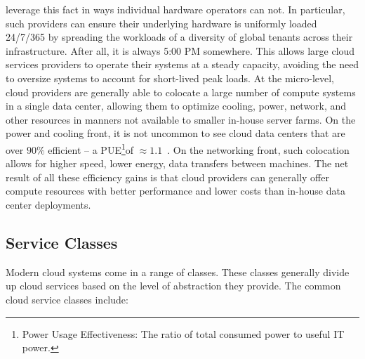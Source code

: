 \begin{packed_desc}
  leverage this fact in ways individual hardware operators can not. In
  particular, such providers can ensure their underlying hardware is
  uniformly loaded 24/7/365 by spreading the workloads of a diversity
  of global tenants across their infrastructure. After all, it is
  always 5:00 PM somewhere. This allows large cloud services providers
  to operate their systems at a steady capacity, avoiding the need to
  oversize systems to account for short-lived peak loads. At the
  micro-level, cloud providers are generally able to colocate a large
  number of compute systems in a single data center, allowing them to
  optimize cooling, power, network, and other resources in manners not
  available to smaller in-house server farms. On the power and cooling
  front, it is not uncommon to see cloud data centers that are over
  $90\%$ efficient -- a PUE\footnote{Power Usage Effectiveness: The
    ratio of total consumed power to useful IT power.}of
  $\approx1.1$~\cite{google-efficiency}. On the networking front, such
  colocation allows for higher speed, lower energy, data transfers
  between machines. The net result of all these efficiency gains is
  that cloud providers can generally offer compute resources with
  better performance and lower costs than in-house data center
  deployments.
\end{packed_desc}

\subsection{Service Classes}

Modern cloud systems come in a range of classes. These classes
generally divide up cloud services based on the level of abstraction
they provide. The common cloud service classes include:

